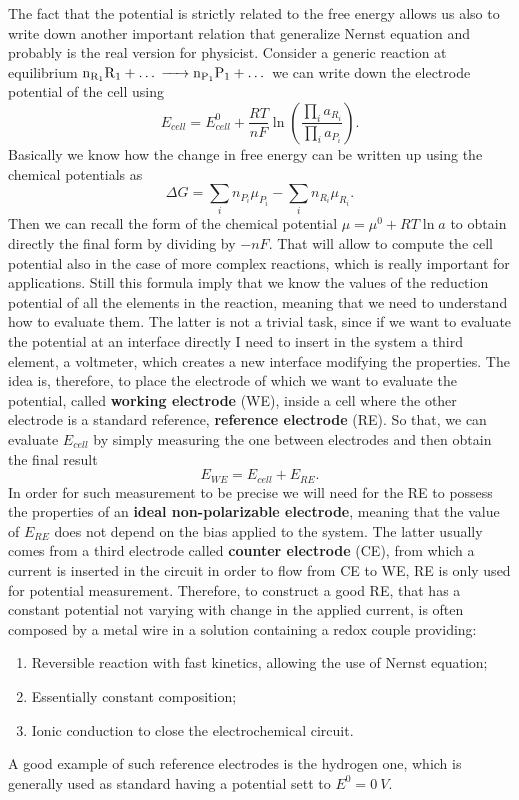 The fact that the potential is strictly related to the free energy allows us also to write down another important relation that generalize Nernst equation and probably is the real version for physicist.
{
    Consider a generic reaction at equilibrium $\ce{n_{R_1}R_1} + \dots \ce{->} \ce{n_{P_1}P_1} + \dots$ we can write down the electrode potential of the cell using
    \begin{equation}
        E_{cell} = E^0_{cell} + \frac{RT}{nF}\ln\left( \frac{\prod_i a_{R_i}}{\prod_i a_{P_i}} \right).
    \end{equation}
}
{
    Basically we know how the change in free energy can be written up using the chemical potentials as
    \begin{equation}
        \Delta G = \sum_i n_{P_i}\mu_{P_i} - \sum_i n_{R_i}\mu_{R_i}.
    \end{equation}
    Then we can recall the form of the chemical potential $\mu = \mu^0 + RT\ln a$ to obtain directly the final form by dividing by $-nF$.
}
\noindent
That will allow to compute the cell potential also in the case of more complex reactions, which is really important for applications. Still this formula imply that we know the values of the reduction potential of all the elements in the reaction, meaning that we need to understand how to evaluate them. The latter is not a trivial task, since if we want to evaluate the potential at an interface directly I need to insert in the system a third element, a voltmeter, which creates a new interface modifying the properties. The idea is, therefore, to place the electrode of which we want to evaluate the potential, called \textbf{working electrode} (WE),  inside a cell where the other electrode is a standard reference, \textbf{reference electrode} (RE). So that, we can evaluate $E_{cell}$ by simply measuring the one between electrodes and then obtain the final result
\begin{equation}
    E_{WE} = E_{cell} + E_{RE}.
\end{equation}
In order for such measurement to be precise we will need for the RE to possess the properties of an \textbf{ideal non-polarizable electrode}, meaning that the value of $E_{RE}$ does not depend on the bias applied to the system. The latter usually comes from a third electrode called \textbf{counter electrode} (CE), from which a current is inserted in the circuit in order to flow from CE to WE, RE is only used for potential measurement. Therefore, to construct a good RE, that has a constant potential not varying with change in the applied current, is often composed by a metal wire in a solution containing a redox couple providing:
\begin{enumerate}[label*=\protect\fbox{\arabic{enumi}}]
    \item Reversible reaction with fast kinetics, allowing the use of Nernst equation;
    \item Essentially constant composition;
    \item Ionic conduction to close the electrochemical circuit.
\end{enumerate}
A good example of such reference electrodes is the hydrogen one, which is generally used as standard having a potential sett to $E^0 = \SI{0}{V}$.

